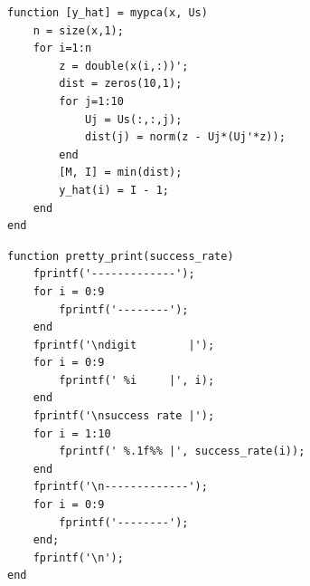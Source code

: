 \documentclass{article}
\begin{document}
\begin{lstlisting}[style=Matlab-editor,title=mypca.m]
function [y_hat] = mypca(x, Us)
    n = size(x,1);
    for i=1:n
        z = double(x(i,:))';
        dist = zeros(10,1);
        for j=1:10
            Uj = Us(:,:,j);
            dist(j) = norm(z - Uj*(Uj'*z));
        end
        [M, I] = min(dist);
        y_hat(i) = I - 1;
    end
end
\end{lstlisting}

\begin{lstlisting}[style=Matlab-editor,title=prettyprint.m]
function pretty_print(success_rate)
    fprintf('-------------');
    for i = 0:9
        fprintf('--------');
    end
    fprintf('\ndigit        |');
    for i = 0:9
        fprintf(' %i     |', i);
    end
    fprintf('\nsuccess rate |');
    for i = 1:10
        fprintf(' %.1f%% |', success_rate(i));
    end
    fprintf('\n-------------');
    for i = 0:9
        fprintf('--------');
    end;
    fprintf('\n');
end
\end{lstlisting}
\end{document}
